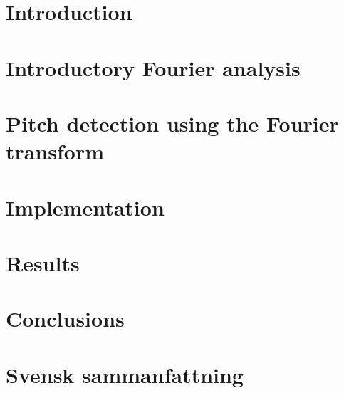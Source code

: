 \documentclass[a4paper,12pt]{article}
\begin{document}

\renewcommand{\cftsecfont}{\fontfamily{comfortaa}\selectfont}

\renewcommand{\cftsubsecfont}{\fontfamily{comfortaa}\selectfont}
\renewcommand{\cftsubsubsecfont}{\fontfamily{comfortaa}\selectfont}
\renewcommand{\contentsname}{\fontfamily{comfortaa}\selectfont Table of Contents}






\setcounter{tocdepth}{2}
\tableofcontents    
\newpage 


\section{Introduction}
 

\section{Introductory Fourier analysis}
 


\section{Pitch detection using the Fourier transform}

\section{Implementation}

\section{Results}


\section{Conclusions}


\section*{Svensk sammanfattning}




\end{document}
